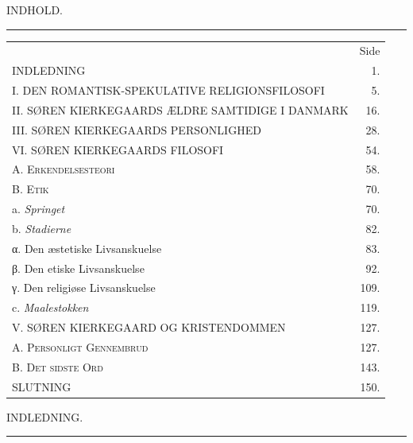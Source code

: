 \documentclass[12pt,a4paper,openany]{book}
\newcommand{\opage}[1]{\marginnote{\footnotesize\textit{[#1]}}}
\begin{document}
\begin{center}INDHOLD.\\[4pt]\rule{1.5cm}{0.4pt}\end{center}
\begin{tabular}{@{}l r@{}}
 & {\small Side}\\
INDLEDNING & 1.\\
I. DEN ROMANTISK-SPEKULATIVE RELIGIONSFILOSOFI & 5.\\
II. SØREN KIERKEGAARDS ÆLDRE SAMTIDIGE I DANMARK & 16.\\
III. SØREN KIERKEGAARDS PERSONLIGHED & 28.\\
VI. SØREN KIERKEGAARDS FILOSOFI & 54.\\
\quad A. \textsc{Erkendelsesteori} & 58.\\
\quad B. \textsc{Etik} & 70.\\
\qquad a. \textit{Springet} & 70.\\
\qquad b. \textit{Stadierne} & 82.\\
\qquad\quad α. Den æstetiske Livsanskuelse & 83.\\
\qquad\quad β. Den etiske Livsanskuelse & 92.\\
\qquad\quad γ. Den religiøse Livsanskuelse & 109.\\
\qquad c. \textit{Maalestokken} & 119.\\
V. SØREN KIERKEGAARD OG KRISTENDOMMEN & 127.\\
\quad A. \textsc{Personligt Gennembrud} & 127.\\
\quad B. \textsc{Det sidste Ord} & 143.\\
SLUTNING & 150.\\
\end{tabular}
\clearpage

\opage{1}\begin{center}INDLEDNING.\\[4pt]\rule{1.5cm}{0.4pt}\end{center}
\end{document}
